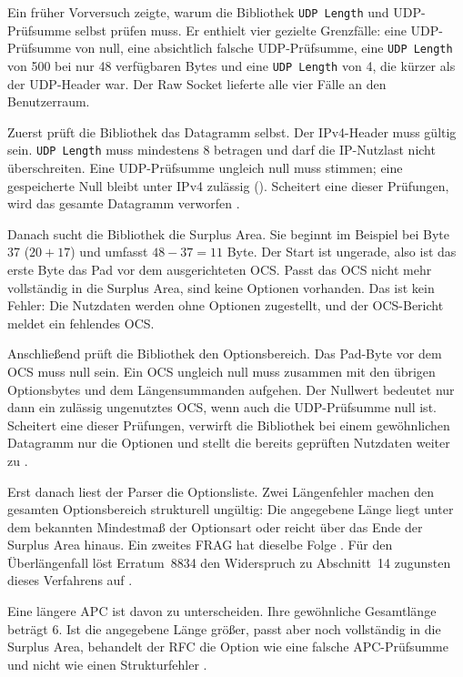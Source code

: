 Ein früher Vorversuch zeigte, warum die Bibliothek \texttt{UDP Length} und UDP-Prüfsumme selbst prüfen
muss. Er enthielt vier gezielte Grenzfälle: eine UDP-Prüfsumme von null, eine absichtlich falsche
UDP-Prüfsumme, eine \texttt{UDP Length} von 500 bei nur 48 verfügbaren Bytes und eine \texttt{UDP Length}
von 4, die kürzer als der UDP-Header war. Der Raw Socket lieferte alle vier Fälle an den Benutzerraum.

Zuerst prüft die Bibliothek das Datagramm selbst. Der IPv4-Header muss gültig sein. \texttt{UDP Length}
muss mindestens 8 betragen und darf die IP-Nutzlast nicht überschreiten. Eine UDP-Prüfsumme ungleich
null muss stimmen; eine gespeicherte Null bleibt unter IPv4 zulässig ().
Scheitert eine dieser Prüfungen, wird das gesamte Datagramm verworfen
\cite[Sec.~10 und 14]{rfc9868}.

Danach sucht die Bibliothek die Surplus Area. Sie beginnt im Beispiel bei Byte 37 ($20 + 17$) und umfasst
$48 - 37 = 11$ Byte. Der Start ist ungerade, also ist das erste
Byte das Pad vor dem ausgerichteten OCS. Passt das OCS nicht mehr vollständig in die Surplus Area, sind
keine Optionen vorhanden. Das ist kein Fehler: Die Nutzdaten werden ohne Optionen zugestellt, und der
OCS-Bericht meldet ein fehlendes OCS.

Anschließend prüft die Bibliothek den Optionsbereich. Das Pad-Byte vor dem OCS muss null sein. Ein OCS
ungleich null muss zusammen mit den übrigen Optionsbytes und dem Längensummanden aufgehen. Der Nullwert
bedeutet nur dann ein zulässig ungenutztes OCS, wenn auch die UDP-Prüfsumme null ist. Scheitert eine
dieser Prüfungen, verwirft die Bibliothek bei einem gewöhnlichen Datagramm nur die Optionen und stellt
die bereits geprüften Nutzdaten weiter zu \cite[Sec.~8, 9 und 14]{rfc9868}.

Erst danach liest der Parser die Optionsliste. Zwei Längenfehler machen den gesamten Optionsbereich
strukturell ungültig: Die angegebene Länge liegt unter dem bekannten Mindestmaß der Optionsart oder
reicht über das Ende der Surplus Area hinaus. Ein zweites FRAG hat dieselbe Folge \cite[Sec.~10]{rfc9868}. Für den
Überlängenfall löst Erratum~8834 den Widerspruch zu Abschnitt~14 zugunsten dieses Verfahrens auf
\cite{rfc9868-eid8834}.

Eine längere APC ist davon zu unterscheiden. Ihre gewöhnliche Gesamtlänge beträgt 6. Ist die angegebene
Länge größer, passt aber noch vollständig in die Surplus Area, behandelt der RFC die Option wie eine
falsche APC-Prüfsumme und nicht wie einen Strukturfehler \cite[Sec.~11.3]{rfc9868}.

